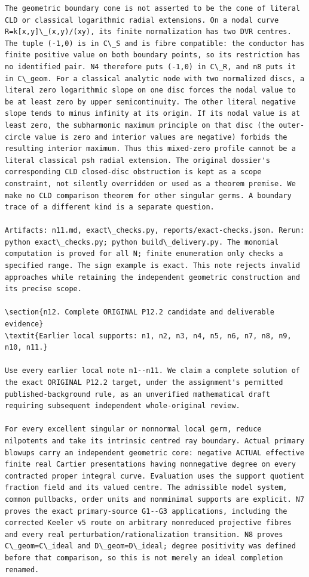 \documentclass[
  11pt,
]{article}
\begin{document}
\begin{lstlisting}
The geometric boundary cone is not asserted to be the cone of literal CLD or classical logarithmic radial extensions. On a nodal curve R=k[x,y]\_(x,y)/(xy), its finite normalization has two DVR centres. The tuple (-1,0) is in C\_S and is fibre compatible: the conductor has finite positive value on both boundary points, so its restriction has no identified pair. N4 therefore puts (-1,0) in C\_R, and n8 puts it in C\_geom. For a classical analytic node with two normalized discs, a literal zero logarithmic slope on one disc forces the nodal value to be at least zero by upper semicontinuity. The other literal negative slope tends to minus infinity at its origin. If its nodal value is at least zero, the subharmonic maximum principle on that disc (the outer-circle value is zero and interior values are negative) forbids the resulting interior maximum. Thus this mixed-zero profile cannot be a literal classical psh radial extension. The original dossier's corresponding CLD closed-disc obstruction is kept as a scope constraint, not silently overridden or used as a theorem premise. We make no CLD comparison theorem for other singular germs. A boundary trace of a different kind is a separate question.

Artifacts: n11.md, exact\_checks.py, reports/exact-checks.json. Rerun: python exact\_checks.py; python build\_delivery.py. The monomial computation is proved for all N; finite enumeration only checks a specified range. The sign example is exact. This note rejects invalid approaches while retaining the independent geometric construction and its precise scope.

\section{n12. Complete ORIGINAL P12.2 candidate and deliverable evidence}
\textit{Earlier local supports: n1, n2, n3, n4, n5, n6, n7, n8, n9, n10, n11.}

Use every earlier local note n1--n11. We claim a complete solution of the exact ORIGINAL P12.2 target, under the assignment's permitted published-background rule, as an unverified mathematical draft requiring subsequent independent whole-original review.

For every excellent singular or nonnormal local germ, reduce nilpotents and take its intrinsic centred ray boundary. Actual primary blowups carry an independent geometric core: negative ACTUAL effective finite real Cartier presentations having nonnegative degree on every contracted proper integral curve. Evaluation uses the support quotient fraction field and its valued centre. The admissible model system, common pullbacks, order units and nonminimal supports are explicit. N7 proves the exact primary-source G1--G3 applications, including the corrected Keeler v5 route on arbitrary nonreduced projective fibres and every real perturbation/rationalization transition. N8 proves C\_geom=C\_ideal and D\_geom=D\_ideal; degree positivity was defined before that comparison, so this is not merely an ideal completion renamed.


\end{lstlisting}
\end{document}
